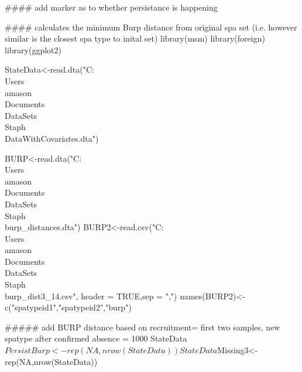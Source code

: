 #### add marker as to whether persistance is happening

####  calculates the minimum Burp distance from original spa set (i.e. however similar is the closest spa type to inital set)
library(msm)
library(foreign)
library(ggplot2)

StateData<-read.dta("C:\\Users\\amason\\Documents\\DataSets\\Staph\\DataWithCovariates.dta")

BURP<-read.dta("C:\\Users\\amason\\Documents\\DataSets\\Staph\\burp_distances.dta")
BURP2<-read.csv("C:\\Users\\amason\\Documents\\DataSets\\Staph\\burp_dist3_14.csv", header = TRUE,sep = ",")
names(BURP2)<-c("spatypeid1","spatypeid2","burp")

##### add BURP distance based on recruitment= first two samples, new spatype after confirmed absence = 1000
 StateData$PersistBurp<-rep(NA,nrow(StateData))
 StateData$Missing3<-rep(NA,nrow(StateData))

